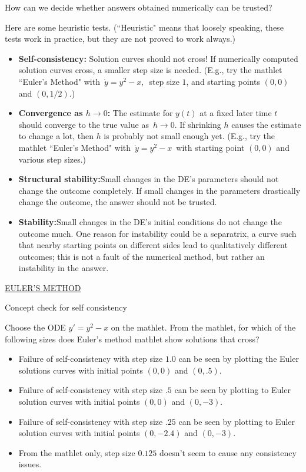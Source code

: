 \begin{question}
  How can we decide whether answers obtained numerically can be trusted?
\end{question}

Here are some heuristic tests.
(“Heuristic" means that loosely speaking, these tests work in practice,
but they are not proved to work always.)

\begin{itemize}
\item \textbf{\color{blue}Self-consistency:} Solution curves should not cross!
  If numerically computed solution curves cross, a smaller step size is needed.
  (E.g., try the mathlet “Euler's Method" with $\, \dot y = y^2 -  x ,\,$ step size $1$,
  and starting points $(0,0)$ and $(0,1/2)$.)
\item \textbf{\color{blue}Convergence as $h \to 0$:} The estimate for $y(t)$ at a fixed later time $t$
  should converge to the true value as $\, h \to 0$.
  If shrinking $h$ causes the estimate to change a lot, then $h$ is probably not small enough yet.
  (E.g., try the mathlet “Euler's Method" with $\, \dot y = y^2 - x\,$ with starting point
  $(0,0)$ and various step sizes.)
\item \textbf{\color{blue}Structural stability:}Small changes in the DE's parameters should not change the outcome completely.
  If small changes in the parameters drastically change the outcome, the answer should not be trusted.
\item \textbf{\color{blue}Stability:}Small changes in the DE's initial conditions do not change the outcome much.
  One reason for instability could be a separatrix,
  a curve such that nearby starting points on different sides lead to qualitatively different outcomes;
  this is not a fault of the numerical method, but rather an instability in the answer.
\end{itemize}

\href{http://mathlets.org/mathlets/eulers-method/}
{EULER'S METHOD}

\begin{exercise}
  Concept check for self consistency
\end{exercise}

Choose the ODE $y' = y^2 - x$ on the mathlet.
From the mathlet, for which of the following sizes does Euler's method mathlet
show solutions that cross?

\begin{itemize}
\item Failure of self-consistency with step size $1.0$ can be seen by plotting the Euler solutions curves
  with initial points $(0,0)$ and $(0,.5)$.
\item Failure of self-consistency with step size $.5$ can be seen by plotting to Euler solution curves
  with initial points $(0,0)$ and $(0,−3)$.
\item Failure of self-consistency with step size $.25$ can be seen by plotting to Euler solution curves
  with initial points $(0,−2.4)$ and $(0,−3)$.
\item From the mathlet only, step size $0.125$ doesn't seem to cause any consistency issues.
\end{itemize}

